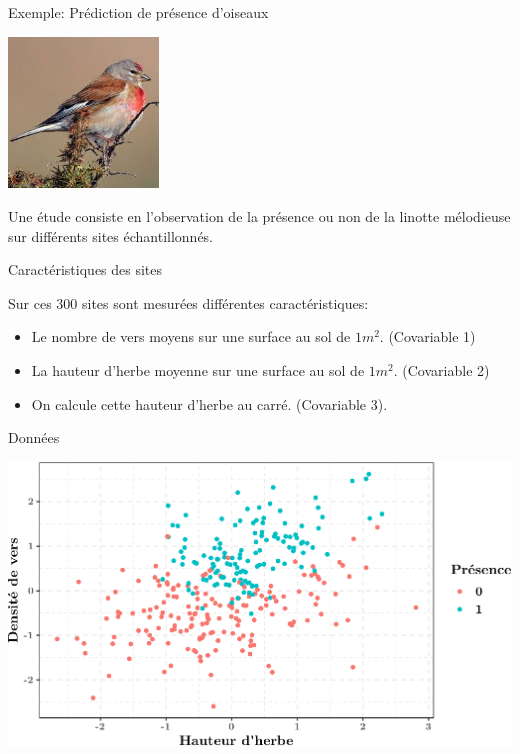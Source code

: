 \documentclass[9pt,ignorenonframetext,]{beamer}
\providecommand{\tightlist}{%
  \setlength{\itemsep}{0pt}\setlength{\parskip}{0pt}}
\begin{document}
\begin{frame}{Exemple: Prédiction de présence d'oiseaux}
\protect\hypertarget{exemple-pruxe9diction-de-pruxe9sence-doiseaux}{}

\includegraphics[width = 0.3\textwidth]{figures/linotte.jpeg}

Une étude consiste en l'observation de la présence ou non de la linotte
mélodieuse sur différents sites échantillonnés.

\begin{block}{Caractéristiques des sites}

Sur ces 300 sites sont mesurées différentes caractéristiques:

\begin{itemize}
\tightlist
\item
  Le nombre de vers moyens sur une surface au sol de \(1m^2\).
  (Covariable 1)
\item
  La hauteur d'herbe moyenne sur une surface au sol de \(1m^2\).
  (Covariable 2)
\item
  On calcule cette hauteur d'herbe au carré. (Covariable 3).
\end{itemize}

\end{block}

\end{frame}

\begin{frame}{Données}
\protect\hypertarget{donnuxe9es}{}

\includegraphics{diapos_mcmc_files/figure-beamer/plot_donnees_presence-1.pdf}

\end{frame}
\end{document}
